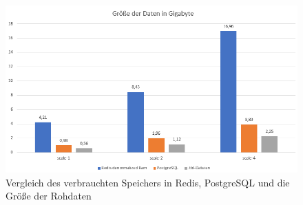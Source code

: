 \begin{figure}[h]  %
    \centering      %
    \includegraphics[width=1\textwidth]{pictures/storage.png}
    \caption{Vergleich des verbrauchten Speichers in Redis, PostgreSQL und die Größe der Rohdaten}      %
    \label{pic:storage}    %
\end{figure}
\newpage

